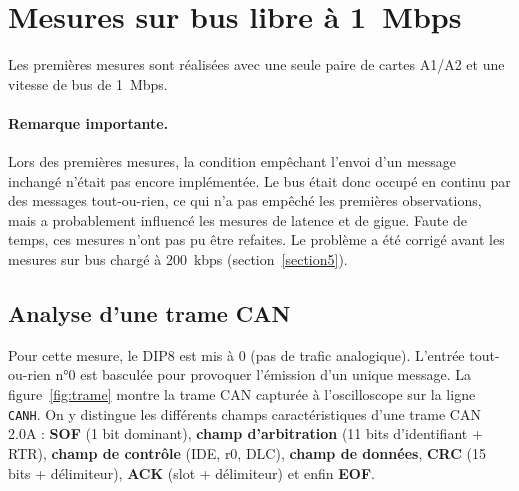 \newpage
\section{Mesures sur bus libre à 1~Mbps}

Les premières mesures sont réalisées avec une seule paire de cartes A1/A2 et
une vitesse de bus de \num{1}~Mbps.

\paragraph{Remarque importante.}
Lors des premières mesures, la condition empêchant l'envoi d'un message
inchangé n'était pas encore implémentée. Le bus était donc occupé en continu
par des messages tout-ou-rien, ce qui n'a pas empêché les premières
observations, mais a probablement influencé les mesures de latence et de
gigue. Faute de temps, ces mesures n'ont pas pu être refaites. Le problème a
été corrigé avant les mesures sur bus chargé à \num{200}~kbps (section~\ref{section5}).

\subsection{Analyse d'une trame CAN}

Pour cette mesure, le DIP8 est mis à 0 (pas de trafic analogique). L'entrée
tout-ou-rien n°0 est basculée pour provoquer l'émission d'un unique message.
La figure~\ref{fig:trame} montre la trame CAN capturée à l'oscilloscope sur la
ligne \texttt{CANH}. On y distingue les différents champs caractéristiques
d'une trame CAN 2.0A : \textbf{SOF} (1 bit dominant), \textbf{champ
d'arbitration} (11 bits d'identifiant + RTR), \textbf{champ de contrôle}
(IDE, r0, DLC), \textbf{champ de données}, \textbf{CRC} (15
bits + délimiteur), \textbf{ACK} (slot + délimiteur) et enfin \textbf{EOF}.

